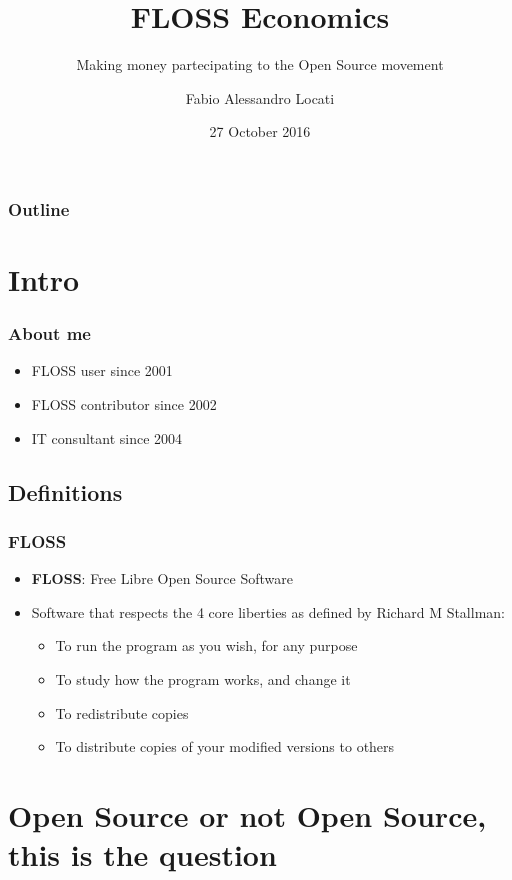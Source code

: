 \documentclass[t,aspectratio=169]{beamer}
\title{FLOSS Economics}
\subtitle{Making money partecipating to the Open Source movement}
\author{Fabio Alessandro Locati}
\date{27 October 2016}
\begin{document}
\maketitle

\begin{frame}
    \frametitle{Outline}
    \tableofcontents
\end{frame}

\section{Intro}
\begin{frame}
    \frametitle{About me}
    \begin{itemize}
        \item<2-> FLOSS user since 2001
        \item<3-> FLOSS contributor since 2002
        \item<4-> IT consultant since 2004 
    \end{itemize}
\end{frame}

\subsection{Definitions}
\begin{frame}
    \frametitle{FLOSS}
    \begin{itemize}
        \item<2-> \textbf{FLOSS}: Free Libre Open Source Software
        \item<3-> Software that respects the 4 core liberties as defined by Richard M Stallman:
        \begin{itemize}
            \item<4-> To run the program as you wish, for any purpose
            \item<5-> To study how the program works, and change it
            \item<6-> To redistribute copies
            \item<7-> To distribute copies of your modified versions to others
        \end{itemize}
    \end{itemize}
\end{frame}

\section{Open Source or not Open Source, this is the question}
\end{document}
